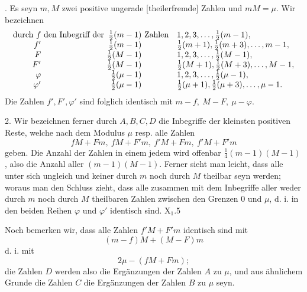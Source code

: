 \NoSourceHead
{}
\par{}. Es seyn $m,M$ zwei positive ungerade [theilerfremde] Zahlen und $mM=\mu$. Wir bezeichnen
\begingroup\small
\[
\begin{array}{r@{\ }l@{\ }r@{\ }l@{\quad}l}
\text{durch }f&\text{den Inbegriff der}&\tfrac12(m-1)&\text{Zahlen}&1,2,3,\ldots,\tfrac12(m-1),\\
f'&&\tfrac12(m-1)&&\tfrac12(m+1),\tfrac12(m+3),\ldots,m-1,\\
F&&\tfrac12(M-1)&&1,2,3,\ldots,\tfrac12(M-1),\\
F'&&\tfrac12(M-1)&&\tfrac12(M+1),\tfrac12(M+3),\ldots,M-1,\\
\varphi&&\tfrac12(\mu-1)&&1,2,3,\ldots,\tfrac12(\mu-1),\\
\varphi'&&\tfrac12(\mu-1)&&\tfrac12(\mu+1),\tfrac12(\mu+3),\ldots,\mu-1.
\end{array}
\]
\endgroup
\noindent Die Zahlen $f',F',\varphi'$ sind folglich identisch mit $m-f,\ M-F,\ \mu-\varphi$.

2. Wir bezeichnen ferner durch $A,B,C,D$ die Inbegriffe der kleinsten positiven Reste, welche nach dem Modulus $\mu$ resp. alle Zahlen
\[
fM+Fm,\ fM+F'm,\ f'M+Fm,\ f'M+F'm
\]
\noindent geben. Die Anzahl der Zahlen in einem jedem wird offenbar $\tfrac14(m-1)(M-1)$, also die Anzahl aller $(m-1)(M-1)$. Ferner sieht man leicht, dass alle unter sich ungleich und keiner durch $m$ noch durch $M$ theilbar seyn werden; woraus man den Schluss zieht, dass alle zusammen mit dem Inbegriffe aller weder durch $m$ noch durch $M$ theilbaren Zahlen zwischen den Grenzen $0$ und $\mu$, d. i. in den beiden Reihen $\varphi$ und $\varphi'$ identisch sind.
\vfill\noindent\small X$_1$.\hfill5\par\normalsize
\clearpage

\par\indent Noch bemerken wir, dass alle Zahlen $f'M+F'm$ identisch sind mit
\[
(m-f)M+(M-F)m
\]
\noindent d. i. mit
\[
2\mu-(fM+Fm);
\]
\noindent die Zahlen $D$ werden also die Ergänzungen der Zahlen $A$ zu $\mu$, und aus ähnlichem Grunde die Zahlen $C$ die Ergänzungen der Zahlen $B$ zu $\mu$ seyn.

